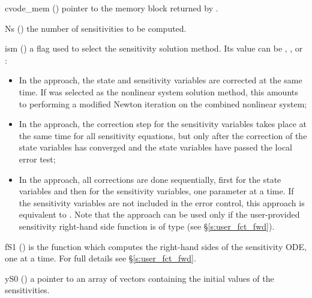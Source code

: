 {
  \begin{args}

  \item[cvode\_mem] ()
    pointer to the {\cvodes} memory block returned by .

  \item[Ns] () 
    the number of sensitivities to be computed.

  \item[ism] ()
    a flag used to select the sensitivity solution method. Its value can 
    be , , or :
    \begin{itemize}
    \item In the  approach, the state and sensitivity variables are
      corrected at the same time. If  was selected as the nonlinear system 
      solution method, this amounts to performing a modified Newton iteration on the
      combined nonlinear system;
    \item In the  approach, the correction step for the sensitivity
      variables takes place at the same time for all sensitivity equations, but only after 
      the correction of the state variables has converged and the state variables 
      have passed the local error test; 
    \item In the  approach, all corrections are done sequentially, first
      for the state variables and then for the sensitivity variables, one parameter at
      a time. If the sensitivity variables are not included in the error control, this 
      approach is equivalent to . Note that the  approach 
      can be used only if the user-provided sensitivity right-hand side function is of type
       (see \S\ref{s:user_fct_fwd}).
    \end{itemize}

  \item[fS1] ()
    is the {\C} function which computes the right-hand sides of the sensitivity ODE, one
    at a time. For full details see \S\ref{s:user_fct_fwd}.

  \item[yS0] () 
    a pointer to an array of  vectors containing the initial 
    values of the sensitivities.

  \end{args}
}
